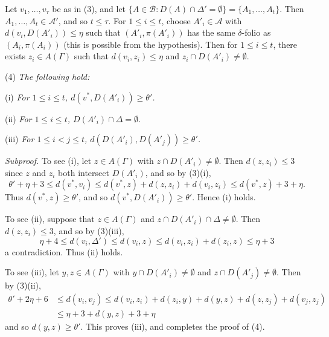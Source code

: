 Let $v_1, \dots, v_{\tau}$ be as in (3), and let $\{A \in \mathcal{B} : D(A) \cap \Delta' = \emptyset\} = \{A_1, \dots, A_t\}$. Then $A_1, \dots, A_t \in \mathcal{A}'$, and so $t \le \tau$. For $1 \le i \le t$, choose $A'_i \in \mathcal{A}$ with $d(v_i, D(A'_i)) \le \eta$ such that $(A'_i, \pi(A'_i))$ has the same $\delta$-folio as $(A_i, \pi(A_i))$ (this is possible from the hypothesis). Then for $1 \le i \le t$, there exists $z_i \in A(\Gamma)$ such that $d(v_i, z_i) \le \eta$ and $z_i \cap D(A'_i) \ne \emptyset$.

\hspace*{12pt}(4) \textit{The following hold:}

\hspace*{12pt}(i) \textit{For $1 \le i \le t$, $d(v^*, D(A'_i)) \ge \theta'$.}

\hspace*{12pt}(ii) \textit{For $1 \le i \le t$, $D(A'_i) \cap \Delta = \emptyset$.}

\hspace*{12pt}(iii) \textit{For $1 \le i < j \le t$, $d(D(A'_i), D(A'_j)) \ge \theta'$.}

\textit{Subproof.} To see (i), let $z \in A(\Gamma)$ with $z \cap D(A'_i) \ne \emptyset$. Then $d(z, z_i) \le 3$ since $z$ and $z_i$ both intersect $D(A'_i)$, and so by (3)(i),
\begin{equation*}
\theta' + \eta + 3 \le d(v^*, v_i) \le d(v^*, z) + d(z, z_i) + d(v_i, z_i) \le d(v^*, z) + 3 + \eta.
\end{equation*}
Thus $d(v^*, z) \ge \theta'$, and so $d(v^*, D(A'_i)) \ge \theta'$. Hence (i) holds.

To see (ii), suppose that $z \in A(\Gamma)$ and $z \cap D(A'_i) \cap \Delta \ne \emptyset$. Then $d(z, z_i) \le 3$, and so by (3)(iii),
\begin{equation*}
\eta + 4 \le d(v_i, \Delta') \le d(v_i, z) \le d(v_i, z_i) + d(z_i, z) \le \eta + 3
\end{equation*}
a contradiction. Thus (ii) holds.

To see (iii), let $y, z \in A(\Gamma)$ with $y \cap D(A'_i) \ne \emptyset$ and $z \cap D(A'_j) \ne \emptyset$. Then by (3)(ii),
\begin{align*}
\theta' + 2\eta + 6 & \le d(v_i, v_j) \le d(v_i, z_i) + d(z_i, y) + d(y, z) + d(z, z_j) + d(v_j, z_j) \\
& \le \eta + 3 + d(y, z) + 3 + \eta
\end{align*}
and so $d(y, z) \ge \theta'$. This proves (iii), and completes the proof of (4).
